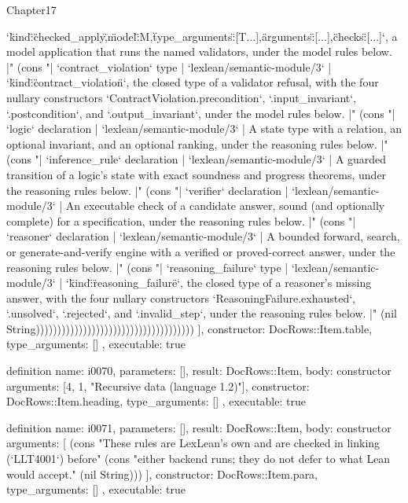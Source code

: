 \begin{lexlean}{Chapter17}
\begin{semanticmodule}
{{`{\"kind\":\"checked_apply\",\"model\":M,\"type_arguments\":[T...],\"arguments\":[...],\"checks\":[...]}`, a model application that runs the named validators, under the model rules below. |" (cons "| `contract_violation` type | `lexlean/semantic-module/3` | `{\"kind\":\"contract_violation\"}`, the closed type of a validator refusal, with the four nullary constructors `ContractViolation.precondition`, `.input_invariant`, `.postcondition`, and `.output_invariant`, under the model rules below. |" (cons "| `logic` declaration | `lexlean/semantic-module/3` | A state type with a relation, an optional invariant, and an optional ranking, under the reasoning rules below. |" (cons "| `inference_rule` declaration | `lexlean/semantic-module/3` | A guarded transition of a logic's state with exact soundness and progress theorems, under the reasoning rules below. |" (cons "| `verifier` declaration | `lexlean/semantic-module/3` | An executable check of a candidate answer, sound (and optionally complete) for a specification, under the reasoning rules below. |" (cons "| `reasoner` declaration | `lexlean/semantic-module/3` | A bounded forward, search, or generate-and-verify engine with a verified or proved-correct answer, under the reasoning rules below. |" (cons "| `reasoning_failure` type | `lexlean/semantic-module/3` | `{\"kind\":\"reasoning_failure\"}`, the closed type of a reasoner's missing answer, with the four nullary constructors `ReasoningFailure.exhausted`, `.unsolved`, `.rejected`, and `.invalid_step`, under the reasoning rules below. |" (nil String)))))))))))))))))))))))))))))))))))))
    ],
    constructor: DocRows::Item.table,
    type_arguments: []
  },
  executable: true
}

definition{
  name: i0070,
  parameters: [],
  result: DocRows::Item,
  body: constructor{
    arguments: [4, 1, "Recursive data (language 1.2)"],
    constructor: DocRows::Item.heading,
    type_arguments: []
  },
  executable: true
}

definition{
  name: i0071,
  parameters: [],
  result: DocRows::Item,
  body: constructor{
    arguments: [
      (cons "These rules are LexLean's own and are checked in linking (`LLT4001`) before" (cons "either backend runs; they do not defer to what Lean would accept." (nil String)))
    ],
    constructor: DocRows::Item.para,
    type_arguments: []
  },
  executable: true
}


\end{semanticmodule}
\end{lexlean}
